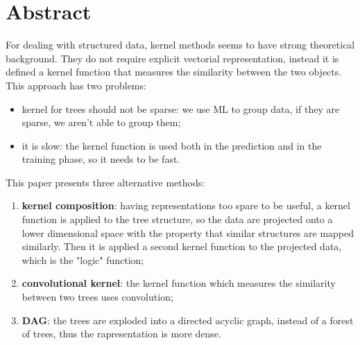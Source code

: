 \section{Abstract}

For dealing with structured data, kernel methods seems to have strong
theoretical background. They do not require explicit vectorial representation,
instead it is defined a kernel function that measures the similarity between
the two objects. This approach has two problems:
\begin{itemize}
	\item kernel for trees should not be sparse: we use ML to group data, if
		they are sparse, we aren't able to group them;

	\item it is slow: the kernel function is used both in the prediction and in
		the training phase, so it needs to be fast.
\end{itemize}

This paper presents three alternative methods:
\begin{enumerate}
	\item \textbf{kernel composition}: having representations too spare to be useful, a kernel function is
	applied to the tree structure, so the data are projected onto a lower
	dimensional space with the property that similar structures are mapped
	similarly. Then it is applied a second kernel function to the projected
	data, which is the "logic" function;

	\item \textbf{convolutional kernel}: the kernel function which measures the
		similarity between two trees uses convolution;

	\item \textbf{DAG}: the trees are exploded into a directed acyclic graph,
		instead of a forest of trees, thus the rapresentation is more dense.
\end{enumerate}
